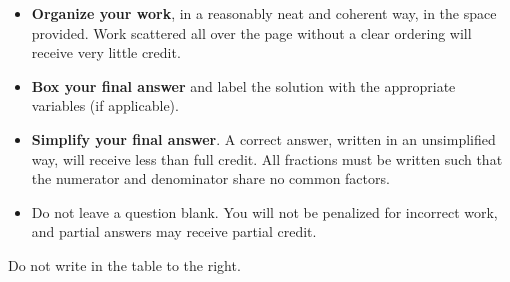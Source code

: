 \documentclass[11pt]{exam}
\begin{document}
\begin{minipage}[t]{3.7in}
\vspace{0pt}
\begin{itemize}

\item \textbf{Organize your work}, in a reasonably neat and coherent way, in
the space provided. Work scattered all over the page without a clear ordering will 
receive very little credit.  

\item \textbf{Box your final answer} and label the solution with the appropriate variables (if applicable).

\item \textbf{Simplify your final answer}. A correct answer, written in an unsimplified way, will receive less than full credit. All fractions must be written such that the numerator and denominator share no common factors.

\item Do not leave a question blank. You will not be penalized for incorrect work, and partial answers may receive partial credit.
\end{itemize}

Do not write in the table to the right.
\end{minipage}
\hfill
\begin{minipage}[t]{2.3in}
\vspace{0pt}
\addpoints %
\gradetable[v]%

\end{minipage}
\newpage %

%
%
%
\end{document}
